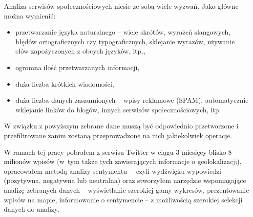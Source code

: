 Analiza serwisów społecznościowych niesie ze sobą wiele wyzwań. Jako główne można wymienić:
\begin{itemize}
  \item przetwarzanie języka naturalnego -- wiele skrótów, wyrażeń slangowych,
błędów ortograficznych czy typograficznych, sklejanie wyrazów, używanie słów
zapożyczonych z obcych języków, itp.,
  \item ogromna ilość przetwarzanych informacji,
  \item duża liczba krótkich wiadomości,
  \item duża liczba danych zaszumionych -- wpisy reklamowe (SPAM), automatycznie 
wklejanie linków do blogów, innych serwisów społecznościowych, itp.
\end{itemize}

W związku z powyższym zebrane dane muszą być odpowiednio przetworzone i przefiltrowane
zanim zostaną przeprowadzone na nich jakiekolwiek operacje.

W ramach tej pracy pobrałem z serwisu Twitter w ciągu 3 miesięcy blisko 8 milionów
wpisów (w~tym także tych zawierających informacje o geolokalizacji), 
opracowałem metodą analizy sentymentu~-- czyli wydźwięku wypowiedzi (pozytywna,
negatywna lub neutralna) oraz stworzyłem narzędzie wspomagające
analizę zebranych danych -- wyświetlanie szerokiej gamy wykresów, prezentowanie
wpisów na mapie, informowanie o sentymencie -- z możliwością szerokiej selekcji danych do analizy.
